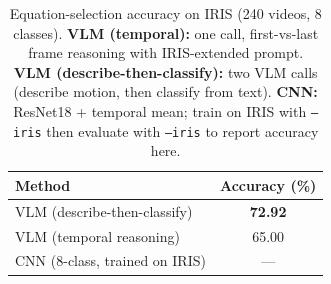 
\begin{table}[t]
  \centering
  \caption{Equation-selection accuracy on IRIS (240 videos, 8 classes). \textbf{VLM (temporal):} one call, first-vs-last frame reasoning with IRIS-extended prompt. \textbf{VLM (describe-then-classify):} two VLM calls (describe motion, then classify from text). \textbf{CNN:} ResNet18 + temporal mean; train on IRIS with \texttt{--iris} then evaluate with \texttt{--iris} to report accuracy here.}
  \label{tab:iris_equation_selection}
  \small
  \setlength{\tabcolsep}{6pt}
  \renewcommand{\arraystretch}{1.2}
  \begin{tabular}{@{}lc@{}}
    \toprule
    \textbf{Method} & \textbf{Accuracy (\%)} \\
    \midrule
    VLM (describe-then-classify) & \textbf{72.92} \\
    VLM (temporal reasoning)     & 65.00 \\
    CNN (8-class, trained on IRIS) & --- \\
    \bottomrule
  \end{tabular}
\end{table}
